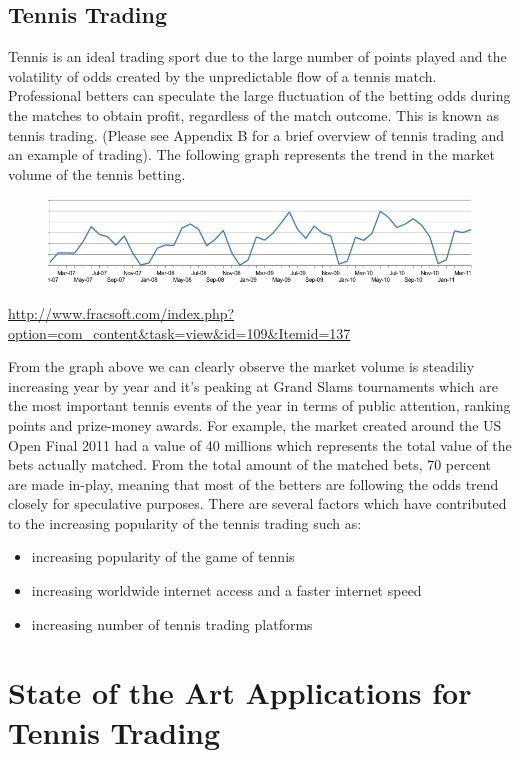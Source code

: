 \documentclass[10pt]{report}
\begin{document}
\subsection{Tennis Trading}

Tennis is an ideal trading sport due to the large number of points played and the volatility of odds created
by the unpredictable flow of a tennis match. Professional betters can speculate the large
fluctuation of the betting odds during the matches to obtain profit, regardless of
the match outcome. This is known as tennis trading. (Please see Appendix B for a brief overview of tennis trading and an example of trading).
The following graph represents the trend in the market volume of the tennis betting.

\begin{figure}[ht]
\centering
\includegraphics[scale=0.4]{bftennis.jpg}
\caption{}
\end{figure}
\url {http://www.fracsoft.com/index.php?option=com_content&task=view&id=109&Itemid=137}

From the graph above we can clearly observe the market volume is steadiliy increasing year by year and it's peaking at 
Grand Slams tournaments which are the most important tennis events of the year in terms of public attention, ranking points and prize-money awards.
For example, the market created around the US Open Final 2011 had a value of 40 millions which represents the total value of the bets actually matched.
From the total amount of the matched bets, 70 percent are made in-play, meaning that most of the betters are following the odds trend closely for 
speculative purposes. 
There are several factors which have contributed to the increasing popularity of the tennis trading such as:
\begin{itemize}
\item increasing popularity of the game of tennis 
\item increasing worldwide internet access and a faster internet speed  
\item increasing number of tennis trading platforms
\end{itemize}


\section{State of the Art Applications for Tennis Trading}
\end{document}
